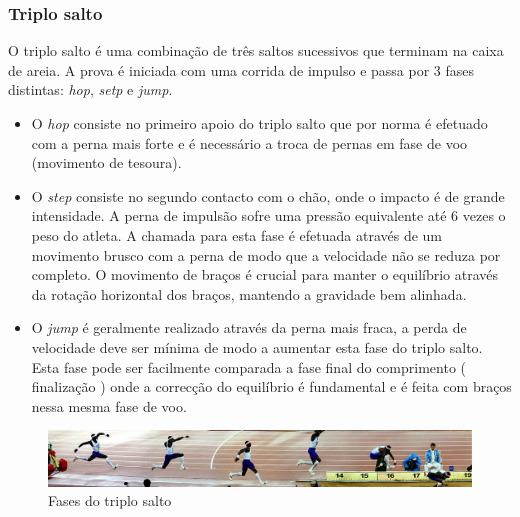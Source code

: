 \documentclass{report}
\begin{document}
            \subsubsection{Triplo salto}
            O triplo salto é uma combinação de três saltos sucessivos que terminam na caixa de areia. A prova é iniciada com uma corrida de impulso e passa por 3 fases distintas: \textit{hop}, \textit{setp} e \textit{jump}.
            
            \begin{itemize}
            
            
            \item
            O \textit{hop} consiste no primeiro apoio do triplo salto que por norma é efetuado com a perna mais forte e é necessário a troca de pernas em fase de voo (movimento de tesoura).
            
            
            \item 
            O \textit{step} consiste no segundo contacto com o chão, onde o impacto é de grande intensidade. A perna de impulsão sofre uma pressão equivalente até 6 vezes o peso do atleta. A chamada para esta fase é efetuada através de um movimento brusco com a perna de modo que a velocidade não se reduza por completo. O movimento de braços é crucial para manter o equilíbrio através da rotação horizontal dos braços, mantendo a gravidade bem alinhada.
            
            
            
            \item 
            O \textit{jump} é geralmente realizado através da perna mais fraca, a perda de velocidade deve ser mínima de modo a aumentar esta fase do triplo salto. Esta fase pode ser facilmente comparada a fase final do comprimento ( finalização ) onde a correcção do equilíbrio é fundamental e é feita com braços nessa mesma fase de voo. \cite{salto}
            
            \end{itemize}
            
            \FloatBarrier
            \begin{figure}[h]
            \center
            \includegraphics[scale=.25,angle=0]{triposaltoCOMPLETO.jpg}
            \caption{Fases do triplo salto}
            \label{fig:saltocomprimento.2}
            \end{figure}
            \FloatBarrier
    
\end{document}
